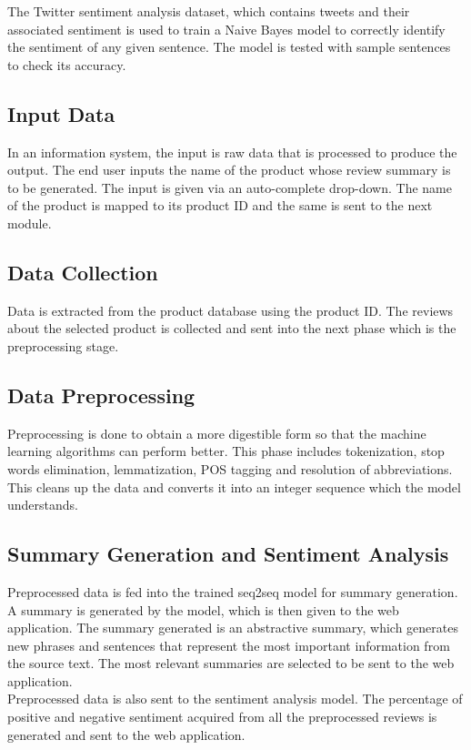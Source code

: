 \documentclass[11pt]{report}
\begin{document}
The Twitter sentiment analysis dataset, which contains tweets and their associated sentiment is used to train a Naive Bayes model to correctly identify the sentiment of any given sentence. The model is tested with sample sentences to check its accuracy. \\

\subsection{Input Data}
In an information system, the input is raw data that is processed to produce the output. The end user inputs the name of the product whose review summary is to be generated. The input is given via an auto-complete drop-down. The name of the product is mapped to its product ID and the same is sent to the next module. 

\subsection{Data Collection}
Data is extracted from the product database using the product ID. The reviews about the selected product is collected and sent into the next phase which is the preprocessing stage. 

\subsection{Data Preprocessing}
Preprocessing is done to obtain a more digestible form so that the machine learning algorithms can perform better. This phase includes tokenization, stop words elimination, lemmatization, POS tagging and resolution of abbreviations. This cleans up the data and converts it into an integer sequence which the model understands. 

\subsection{Summary Generation and Sentiment Analysis}
Preprocessed data is fed into the trained seq2seq model for summary generation. A summary is generated by the model, which is then given to the web application. The summary generated is an abstractive summary, which generates new phrases and sentences that represent the most important information from the source text. The most relevant summaries are selected to be sent to the web application. \\

Preprocessed data is also sent to the sentiment analysis model. The percentage of positive and negative sentiment acquired from all the preprocessed reviews is generated and sent to the web application. 
\end{document}
